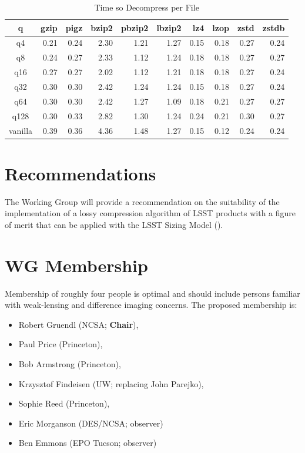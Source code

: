 \begin{table}
\caption{Time so Decompress per File}
\centering
\begin{tabular}[]{crrrrrrrrr}
\hline
 q        &  gzip & pigz & bzip2 & pbzip2 & lbzip2 & lz4 & lzop & zstd & zstdb  \\
\hline
 q4       &    0.21 &   0.24 &   2.30 &   1.21 &   1.27 &   0.15 &   0.18 &   0.27 &   0.24  \\
 q8       &    0.24 &   0.27 &   2.33 &   1.12 &   1.24 &   0.18 &   0.18 &   0.27 &   0.27  \\
 q16      &    0.27 &   0.27 &   2.02 &   1.12 &   1.21 &   0.18 &   0.18 &   0.27 &   0.24  \\
 q32      &    0.30 &   0.30 &   2.42 &   1.24 &   1.24 &   0.15 &   0.18 &   0.27 &   0.24  \\
 q64      &    0.30 &   0.30 &   2.42 &   1.27 &   1.09 &   0.18 &   0.21 &   0.27 &   0.27  \\
 q128     &    0.30 &   0.33 &   2.82 &   1.30 &   1.24 &   0.24 &   0.21 &   0.30 &   0.27  \\
 vanilla  &    0.39 &   0.36 &   4.36 &   1.48 &   1.27 &   0.15 &   0.12 &   0.24 &   0.24  \\
\hline
\end{tabular}
\label{timing_decompress}
\end{table}




\section{Recommendations}

The Working Group will provide a recommendation on the suitability of the implementation
of a lossy compression algorithm of LSST products with a figure of merit that can be 
applied with the LSST Sizing Model ().


\section{WG Membership}

Membership of roughly four people is optimal and should include persons familiar 
with weak-lensing and difference imaging concerns.
The proposed membership is:

\begin{itemize}
    \item Robert Gruendl (NCSA; \textbf{Chair}),
    \item Paul Price (Princeton),
    \item Bob Armstrong (Princeton),
    \item Krzysztof Findeisen (UW; replacing John Parejko),
    \item Sophie Reed (Princeton),
    \item Eric Morganson (DES/NCSA; observer)
    \item Ben Emmons (EPO Tucson; observer)
\end{itemize}

